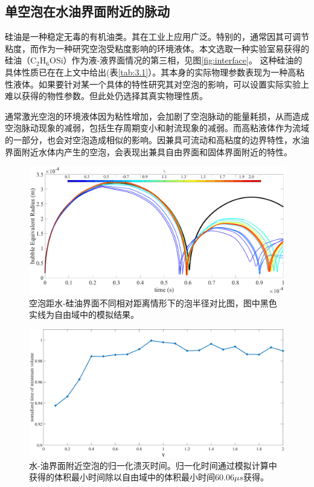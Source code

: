 \subsection{单空泡在水油界面附近的脉动}
硅油是一种稳定无毒的有机油类。其在工业上应用广泛。特别的，通常因其可调节粘度，而作为一种研究空泡受粘度影响的环境液体。本文选取一种实验室易获得的硅油（$\mathrm{C_2H_6OSi}$）作为液-液界面情况的第三相，见图\ref{fig:interface}。
这种硅油的具体性质已在在上文中给出(表\ref{tab:3.1}）。其本身的实际物理参数表现为一种高粘性液体。如果要针对某一个具体的特性研究其对空泡的影响，可以设置实际实验上难以获得的物性参数。但此处仍选择其真实物理性质。

通常激光空泡的环境液体因为粘性增加，会加剧了空泡脉动的能量耗损，从而造成空泡脉动现象的减弱，包括生存周期变小和射流现象的减弱。而高粘液体作为流域的一部分，也会对空泡造成相似的影响。因兼具可流动和高粘度的边界特性，水油界面附近水体内产生的空泡，会表现出兼具自由界面和固体界面附近的特性。

\begin{figure}[h]
    \centering
    \includegraphics[width=1\linewidth]{img/fig3.oilradius.eps}
    \caption[空泡距水-硅油界面不同相对距离情形下的泡半径对比图]{空泡距水-硅油界面不同相对距离情形下的泡半径对比图，图中黑色实线为自由域中的模拟结果。}
    \label{fig3.oilradius}
\end{figure}

\begin{figure}[H]
    \centering
    \includegraphics[width=0.9\linewidth]{img/oilclpstime.eps}
    \caption[水-油界面附近空泡的归一化溃灭时间]{水-油界面附近空泡的归一化溃灭时间。归一化时间通过模拟计算中获得的体积最小时间除以自由域中的体积最小时间60.06$\mu s $获得。}
    \label{fig:oilcolltime}
\end{figure}

